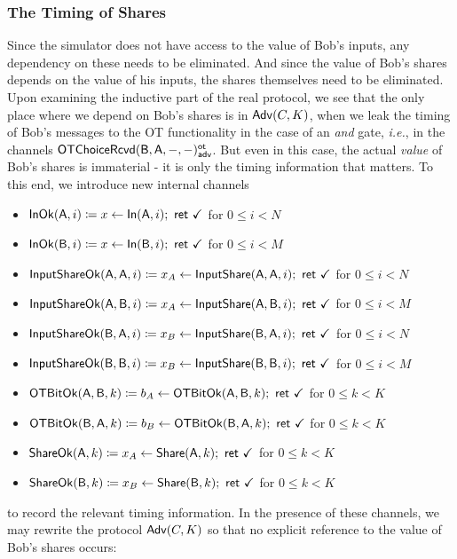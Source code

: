 \subsubsection{The Timing of Shares}
Since the simulator does not have access to the value of Bob's inputs, any dependency on these needs to be eliminated. And since the value of Bob's shares depends on the value of his inputs, the shares themselves need to be eliminated. Upon examining the inductive part of the real protocol, we see that the only place where we depend on Bob's shares is in $\mathsf{Adv}(C,K)$, when we leak the timing of Bob's messages to the OT functionality in the case of an \emph{and} gate, \emph{i.e.}, in the channels $\mathsf{OTChoiceRcvd}(\mathsf{B},\mathsf{A},-,-)^{\mathsf{ot}}_{\mathsf{adv}}$. But even in this case, the actual \emph{value} of Bob's shares is immaterial - it is only the timing information that matters. To this end, we introduce new internal channels\smallskip
\begin{itemize}
\item $\mathsf{InOk}(\mathsf{A},i) \coloneqq x \leftarrow \mathsf{In}(\mathsf{A},i); \ \mathsf{ret} \ \checkmark$ for $0 \leq i < N$
\item $\mathsf{InOk}(\mathsf{B},i) \coloneqq x \leftarrow \mathsf{In}(\mathsf{B},i); \ \mathsf{ret} \ \checkmark$ for $0 \leq i < M$\smallskip
\item $\mathsf{InputShareOk}(\mathsf{A},\mathsf{A},i) \coloneqq x_A \leftarrow \mathsf{InputShare}(\mathsf{A},\mathsf{A},i); \ \mathsf{ret} \ \checkmark$ for $0 \leq i < N$
\item $\mathsf{InputShareOk}(\mathsf{A},\mathsf{B},i) \coloneqq x_A \leftarrow \mathsf{InputShare}(\mathsf{A},\mathsf{B},i); \ \mathsf{ret} \ \checkmark$ for $0 \leq i < M$
\item $\mathsf{InputShareOk}(\mathsf{B},\mathsf{A},i) \coloneqq x_B \leftarrow \mathsf{InputShare}(\mathsf{B},\mathsf{A},i); \ \mathsf{ret} \ \checkmark$ for $0 \leq i < N$
\item $\mathsf{InputShareOk}(\mathsf{B},\mathsf{B},i) \coloneqq x_B \leftarrow \mathsf{InputShare}(\mathsf{B},\mathsf{B},i); \ \mathsf{ret} \ \checkmark$ for $0 \leq i < M$\smallskip
\item $\mathsf{OTBitOk}(\mathsf{A},\mathsf{B},k) \coloneqq b_A \leftarrow \mathsf{OTBitOk}(\mathsf{A},\mathsf{B},k); \ \mathsf{ret} \ \checkmark$ for $0 \leq k < K$
\item $\mathsf{OTBitOk}(\mathsf{B},\mathsf{A},k) \coloneqq b_B \leftarrow \mathsf{OTBitOk}(\mathsf{B},\mathsf{A},k); \ \mathsf{ret} \ \checkmark$ for $0 \leq k < K$\smallskip
\item $\mathsf{ShareOk}(\mathsf{A},k) \coloneqq x_A \leftarrow \mathsf{Share}(\mathsf{A},k); \ \mathsf{ret} \ \checkmark$ for $0 \leq k < K$
\item $\mathsf{ShareOk}(\mathsf{B},k) \coloneqq x_B \leftarrow \mathsf{Share}(\mathsf{B},k); \ \mathsf{ret} \ \checkmark$ for $0 \leq k < K$
\end{itemize}\smallskip
to record the relevant timing information. In the presence of these channels, we may rewrite the protocol $\mathsf{Adv}(C,K)$ so that no explicit reference to the value of Bob's shares occurs:

